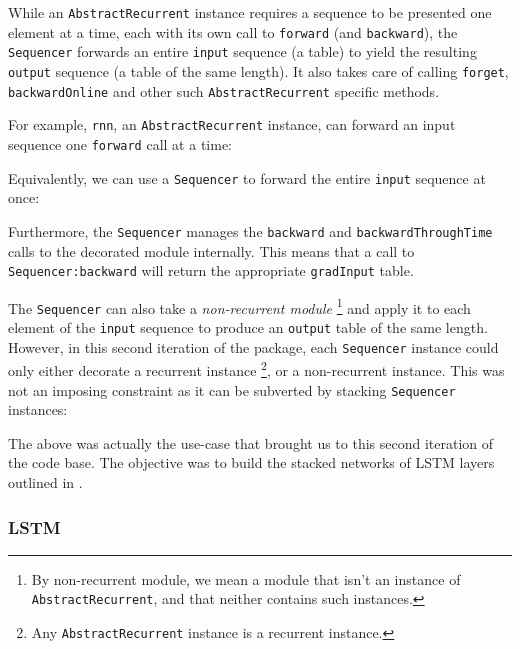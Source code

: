 \documentclass{article} %
\providecommand{\inlinecode}[1]{\texttt{#1}}
\begin{document}


While an \inlinecode{AbstractRecurrent} instance requires a sequence to be presented one element at a time, 
each with its own call to \inlinecode{forward} (and \inlinecode{backward}), 
the \inlinecode{Sequencer} forwards an entire \inlinecode{input} sequence (a table) 
to yield the resulting \inlinecode{output} sequence (a table of the same length). 
It also takes care of calling \inlinecode{forget}, \inlinecode{backwardOnline} and 
other such \inlinecode{AbstractRecurrent} specific methods.

For example, \inlinecode{rnn}, an \inlinecode{AbstractRecurrent} instance, 
can forward an input sequence one \inlinecode{forward} call at a time:



Equivalently, we can use a \inlinecode{Sequencer} to forward the entire \inlinecode{input} sequence at once:



Furthermore, the \inlinecode{Sequencer} manages the \inlinecode{backward} and 
\inlinecode{backwardThroughTime} calls to the decorated module internally. 
This means that a call to \inlinecode{Sequencer:backward} will return the appropriate
\inlinecode{gradInput} table.

The \inlinecode{Sequencer} can also take a \textit{non-recurrent module}
\footnote{By non-recurrent module, we mean a module that isn't an instance of \inlinecode{AbstractRecurrent},
and that neither contains such instances.}
and apply it to each element of the \inlinecode{input} sequence to produce an \inlinecode{output} table of the same length. 
However, in this second iteration of the package, each \inlinecode{Sequencer} 
instance could only either decorate a recurrent instance
\footnote{Any \inlinecode{AbstractRecurrent} instance is a recurrent instance.},
or a non-recurrent instance.
This was not an imposing constraint as it can be subverted by stacking \inlinecode{Sequencer} instances:



The above was actually the use-case that brought us to this second iteration of the code base. 
The objective was to build the stacked networks of LSTM layers outlined in \cite{zaremba2014recurrent}.

\subsubsection{LSTM}
\end{document}

